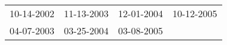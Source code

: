\begin{supertabular}{llll}
 10-14-2002 &  11-13-2003 &  12-01-2004 &  10-12-2005 \\
 04-07-2003 &  03-25-2004 &  03-08-2005 &             \\
\end{supertabular}
